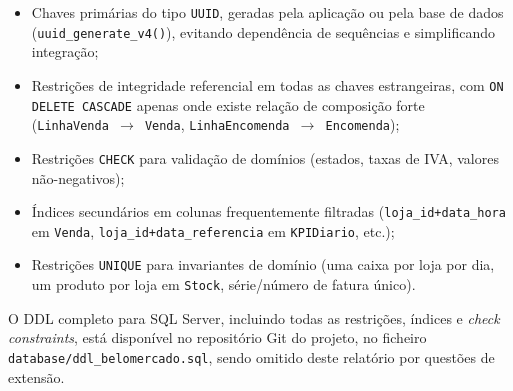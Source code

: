     \begin{itemize}
        \item Chaves primárias do tipo \texttt{UUID}, geradas pela aplicação ou pela base de dados (\texttt{uuid\_generate\_v4()}), evitando dependência de sequências e simplificando integração;
        \item Restrições de integridade referencial em todas as chaves estrangeiras, com \texttt{ON DELETE CASCADE} apenas onde existe relação de composição forte (\texttt{LinhaVenda~$\rightarrow$~Venda}, \texttt{LinhaEncomenda~$\rightarrow$~Encomenda});
        \item Restrições \texttt{CHECK} para validação de domínios (estados, taxas de IVA, valores não-negativos);
        \item Índices secundários em colunas frequentemente filtradas (\texttt{loja\_id+data\_hora} em \texttt{Venda}, \texttt{loja\_id+data\_referencia} em \texttt{KPIDiario}, etc.);
        \item Restrições \texttt{UNIQUE} para invariantes de domínio (uma caixa por loja por dia, um produto por loja em \texttt{Stock}, série/número de fatura único).
    \end{itemize}

    O DDL completo para SQL Server, incluindo todas as restrições, índices e \textit{check constraints}, está disponível no repositório Git do projeto, no ficheiro \texttt{database/ddl\_belomercado.sql}, sendo omitido deste relatório por questões de extensão.

